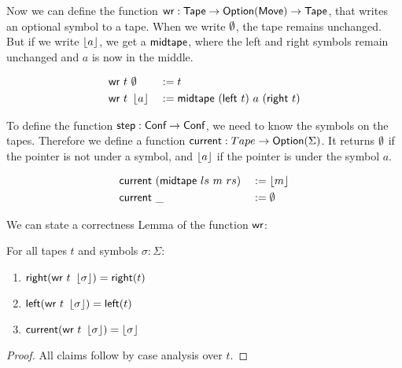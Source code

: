 
Now we can define the function $\textsf{wr} : \textsf{Tape} \rightarrow \textsf{Option}(\textsf{Move}) \rightarrow \textsf{Tape}$, that writes an optional symbol to a tape.  When we write $\emptyset$,
the tape remains unchanged.  But if we write $\left\lfloor {a} \right\rfloor$, we get a $\textsf{midtape}$, where the left and right symbols remain unchanged and $a$ is now in
the middle.

\begin{definition}[$\MS{wr}$]
  \begin{alignat*}{3}
    \textsf{wr}~t &~ \emptyset   &&:= t \\
    \textsf{wr}~t &~ \left\lfloor {a} \right\rfloor &&:= \textsf{midtape}~(\textsf{left}~t)~{a}~(\textsf{right}~t)
  \end{alignat*}
\end{definition}

To define the function $\textsf{step} : \textsf{Conf} \rightarrow \textsf{Conf}$, we need to know the symbols on the tapes.  Therefore we define a function
$\textsf{current} : Tape \rightarrow \textsf{Option}(\Sigma)$.  It returns $\emptyset$ if the pointer is not under a symbol, and $\left\lfloor {a} \right\rfloor$ if the pointer is under the
symbol $a$.

\begin{definition}[$\MS{current}$]
  \begin{alignat*}{2}
    \textsf{current}&~(\textsf{midtape}~{ls}~{m}~{rs})&&:= \left\lfloor {m} \right\rfloor \\
    \textsf{current}&~\_                          &&:= \emptyset
  \end{alignat*}
\end{definition}

We can state a correctness Lemma of the function $\MS{wr}$:

\begin{lemma}[Correctness of $\MS{wr}$]
  \label{lem:write}
  For all tapes $t$ and symbols $\sigma:\Sigma$:
  \begin{enumerate}
  \item $\textsf{right}   (\textsf{wr}~t~\left\lfloor {\sigma} \right\rfloor) = \textsf{right}(t)$
  \item $\textsf{left}    (\textsf{wr}~t~\left\lfloor {\sigma} \right\rfloor) = \textsf{left} (t)$
  \item $\textsf{current} (\textsf{wr}~t~\left\lfloor {\sigma} \right\rfloor) = \left\lfloor {\sigma} \right\rfloor$
  \end{enumerate}
\end{lemma}
\begin{proof}
  All claims follow by case analysis over $t$.
\end{proof}

